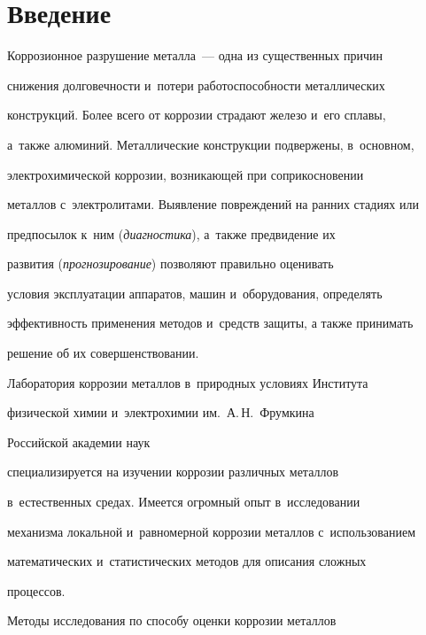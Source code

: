       \thispagestyle{headings}





\section{Введение}


    


   Коррозионное разрушение металла~--- одна из существенных причин 


снижения долговечности и~потери работоспособности металлических 


конструкций. Более всего от коррозии страдают железо и~его сплавы, 


а~также алюминий. Металлические конструкции подвержены, в~основном, 


электрохимической коррозии, возникающей при соприкосновении 


металлов с~электролитами. Выявление повреждений на ранних стадиях или 


предпосылок к~ним (\textit{диагностика}), а~также предвидение их 


развития (\textit{прогнозирование}) позволяют правильно оценивать 


условия эксплуатации аппаратов, машин и~оборудования, определять 


эффективность применения методов и~средств защиты, а также принимать 


решение об их совершенствовании.


   


   Лаборатория коррозии металлов в~природных условиях Института


   физической химии и~электрохимии им.\ А.\,Н.~Фрумкина


   Российской академии наук 


специализируется на изучении коррозии различных металлов 


в~естественных средах. Имеется огромный опыт в~исследовании 


механизма локальной и~равномерной коррозии металлов с~использованием 


математических и~статистических методов для описания сложных 


процессов. 


   


   Методы исследования по способу оценки коррозии металлов 


